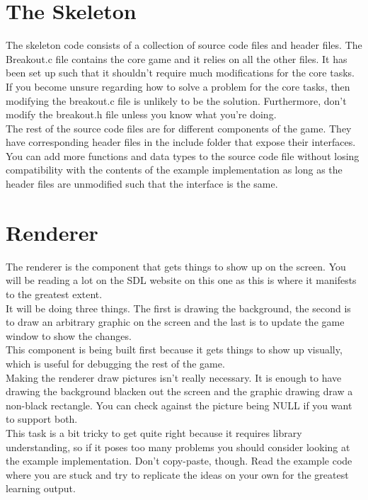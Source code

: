 \documentclass[12pt]{article}
\begin{document}
\section{The Skeleton}
The skeleton code consists of a collection of source code files and header files. The Breakout.c file contains the core game and it relies on all the other files. It has been set up such that it shouldn't require much modifications for the core tasks.
 If you become unsure regarding how to solve a problem for the core tasks, then modifying the breakout.c file is unlikely to be the solution. Furthermore, don't modify the breakout.h file unless you know what you're doing.\\
The rest of the source code files are for different components of the game. They have corresponding header files in the include folder that expose their interfaces. You can add more functions and data types to the source code file without losing compatibility with the contents of the example implementation as long as the header files are unmodified such that the interface is the same.

\section{Renderer}
The renderer is the component that gets things to show up on the screen. You will be reading a lot on the SDL website on this one as this is where it manifests to the greatest extent.\\
It will be doing three things. The first is drawing the background, the second is to draw an arbitrary graphic on the screen and the last is to update the game window to show the changes.\\
This component is being built first because it gets things to show up visually, which is useful for debugging the rest of the game.\\
Making the renderer draw pictures isn't really necessary. It is enough to have drawing the background blacken out the screen and the graphic drawing draw a non-black rectangle. You can check against the picture being NULL if you want to support both.\\
This task is a bit tricky to get quite right because it requires library understanding, so if it poses too many problems you should consider looking at the example implementation. Don't copy-paste, though. Read the example code where you are stuck and try to replicate the ideas on your own for the greatest learning output.
\end{document}
